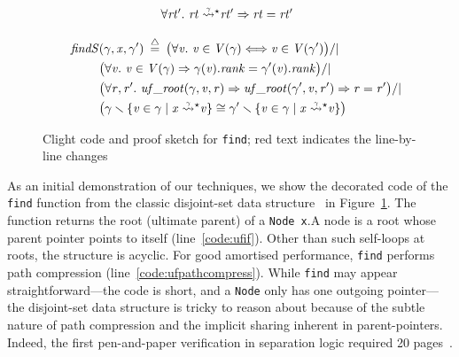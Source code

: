 \documentclass[acmsmall,screen]{acmart}
\newcommand{\li}[1]{{\texttt{\small #1}}}
\newcommand{\reachable}[5]{\ensuremath{{\m{#1}\;\accentset{#2}{\leadsto}^{#3}_{#4} \m{#5}}}}
\newcommand{\defeq}{\mathbin{\stackrel{\triangle}{=}}}
\newcommand{\tx}[1]{\text{#1}}
\begin{document}
\begin{figure}[t]
{\begin{flushleft}
\begin{minipage}[c]{0.46\textwidth}
\begin{equation*}
\begin{array}{@{}l@{}lcl@{}}
&\multicolumn{3}{@{}l}{\forall \m{rt'}.~\reachable{rt}{\gamma}{\star}{}{rt'} => \m{rt} = \m{rt'}}
\end{array}
\end{equation*}
\end{minipage}
\vline
\begin{minipage}[c]{0.5\textwidth}
\vspace*{-1ex}
\begin{equation*}
\begin{split}
\quad \m{findS}&(\gamma,\m{x},\gamma') \; \defeq \; \big(\forall \m{v}.~ \m{v}\in\m{V}(\gamma) <=> \m{v}\in\m{V}(\gamma') \big) /| \null \\
&\big(\forall \m{v}.~\m{v}\in\m{V}(\gamma) => \gamma(\m{v}).\m{rank} = \gamma'(\m{v}).\m{rank} \big) /| \null \\
&\big(\forall \m{r},\m{r'}.~\m{uf\_root}(\gamma, \m{v}, \m{r}) => \m{uf\_root}(\gamma', \m{v}, \m{r'}) => \m{r} = \m{r'} \big) /|  \null \\
&\big(\gamma \smallsetminus \{\m{v} \in \gamma \mid \reachable{x}{\gamma}{\star}{}{v}\} \cong \gamma' \smallsetminus \{\m{v} \in \gamma \mid \reachable{x}{\gamma}{\star}{}{v}\}\big)
\end{split}
\end{equation*}
\end{minipage}
\end{flushleft}
}









\vspace{-0.4em}
\caption{Clight code and proof sketch for \li{find}; {\color{red}red} text indicates the line-by-line changes}
\label{fig:find}
\vspace{-1em}
\end{figure}

\renewcommand{\tx}[1]{\text{#1}}
 
As an initial demonstration of our techniques, we show the decorated code of the
\li{find} function from the classic disjoint-set data structure~\cite{clrs} in
Figure~\ref{fig:find}. The function returns the root
(ultimate parent) of a \li{Node x}.\hspace{0.5em}A node is a root whose parent
pointer points to itself (line~\ref{code:ufif}).
Other than such self-loops at roots, the structure is acyclic.
For good amortised performance, \li{find} performs path
compression (line~\ref{code:ufpathcompress}).
While \li{find} may appear straightforward---the code is short, 
and a \li{Node} only has one outgoing pointer---the
disjoint-set data structure is tricky to reason about 
because of the subtle nature of path compression and the
implicit sharing inherent in parent-pointers. Indeed, the first pen-and-paper
verification in separation logic required 20 pages~\cite{neelthesis}.
\end{document}
